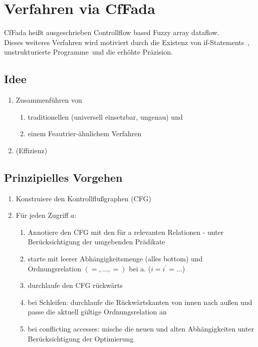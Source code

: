 
\section{Verfahren via CfFada}
CfFada heißt ausgeschrieben \glqq Controllflow based Fuzzy array dataflow\grqq.\\
Dieses weiteres Verfahren wird motiviert durch die Existenz von \glqq if-Statements\grqq\ , \glqq unstrukturierte Programme\grqq\ und die erhöhte \glqq Präzision\grqq.


\subsection{Idee}
\begin{enumerate}
\item Zusammenführen von
  \begin{enumerate}
  \item traditionellen (universell einsetzbar, ungenau) und
  \item einem Feautrier-ähnlichem Verfahren
  \end{enumerate}
\item (Effizienz)
\end{enumerate}


\subsection{Prinzipielles Vorgehen}
\begin{enumerate}
\item Konstruiere den Kontrollflußgraphen (CFG)
\item Für jeden Zugriff $a$:
  \begin{enumerate}
  \item Annotiere den CFG mit den für a relevanten Relationen - unter Berücksichtigung der umgebenden Prädikate
  \item starte mit leerer Abhängigkeitsmenge (alles bottom) und Ordnungsrelation $(=,...,=)$ bei a. (\( i = i^\prime = \dots \))
  \item durchlaufe den CFG rückwärts
  \item bei Schleifen: durchlaufe die Rückwärtskanten von innen nach außen und passe die aktuell gültige Ordnungsrelation an
  \item bei \glqq conflicting accesses\grqq : mische die neuen und alten Abhängigkeiten unter Berücksichtigung der Optimierung
  \end{enumerate}
\end{enumerate}


